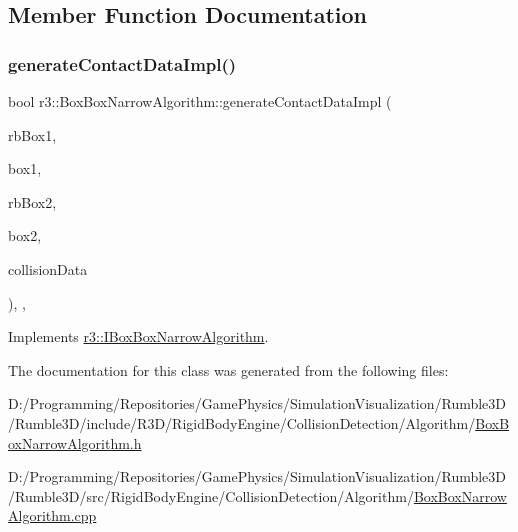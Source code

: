 \subsection{Member Function Documentation}
\mbox{\label{classr3_1_1_box_box_narrow_algorithm_a200098ad4e6e2381f58856002a2d5dec}} 
\subsubsection{\texorpdfstring{generate\+Contact\+Data\+Impl()}{generateContactDataImpl()}}
{\footnotesize\ttfamily bool r3\+::\+Box\+Box\+Narrow\+Algorithm\+::generate\+Contact\+Data\+Impl (\begin{DoxyParamCaption}\item[{\mbox{\hyperlink{classr3_1_1_rigid_body}{Rigid\+Body}} $\ast$}]{rb\+Box1,  }\item[{\mbox{\hyperlink{classr3_1_1_collision_box}{Collision\+Box}} $\ast$}]{box1,  }\item[{\mbox{\hyperlink{classr3_1_1_rigid_body}{Rigid\+Body}} $\ast$}]{rb\+Box2,  }\item[{\mbox{\hyperlink{classr3_1_1_collision_box}{Collision\+Box}} $\ast$}]{box2,  }\item[{\mbox{\hyperlink{classr3_1_1_collision_data}{Collision\+Data}} \&}]{collision\+Data }\end{DoxyParamCaption})\hspace{0.3cm}{\ttfamily [override]}, {\ttfamily [protected]}, {\ttfamily [virtual]}}



Implements \mbox{\hyperlink{classr3_1_1_i_box_box_narrow_algorithm_abc15898100b5ed0537e4c6ccc6610069}{r3\+::\+I\+Box\+Box\+Narrow\+Algorithm}}.



The documentation for this class was generated from the following files\+:\begin{DoxyCompactItemize}
\item 
D\+:/\+Programming/\+Repositories/\+Game\+Physics/\+Simulation\+Visualization/\+Rumble3\+D/\+Rumble3\+D/include/\+R3\+D/\+Rigid\+Body\+Engine/\+Collision\+Detection/\+Algorithm/\mbox{\hyperlink{_box_box_narrow_algorithm_8h}{Box\+Box\+Narrow\+Algorithm.\+h}}\item 
D\+:/\+Programming/\+Repositories/\+Game\+Physics/\+Simulation\+Visualization/\+Rumble3\+D/\+Rumble3\+D/src/\+Rigid\+Body\+Engine/\+Collision\+Detection/\+Algorithm/\mbox{\hyperlink{_box_box_narrow_algorithm_8cpp}{Box\+Box\+Narrow\+Algorithm.\+cpp}}\end{DoxyCompactItemize}
